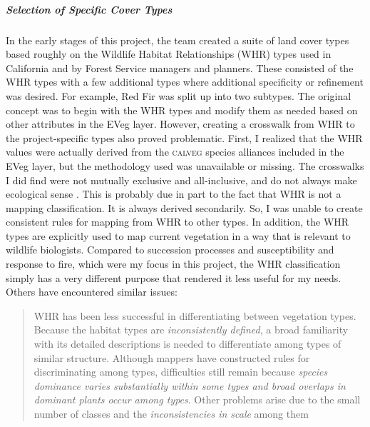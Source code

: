 

\subparagraph*{Selection of Specific Cover Types}
In the early stages of this project, the team created a suite of land cover types based roughly on the Wildlife Habitat Relationships (WHR) types used in California and by Forest Service managers and planners. These consisted of the WHR types with a few additional types where additional specificity or refinement was desired. For example, Red Fir was split up into two subtypes. The original concept was to begin with the WHR types and modify them as needed based on other attributes in the EVeg layer. However, creating a crosswalk from WHR to the project-specific types also proved problematic. First, I realized that the WHR values were actually derived from the \textsc{calveg} species alliances included in the EVeg layer, but the methodology used was unavailable or missing. The crosswalks I did find were not mutually exclusive and all-inclusive, and do not always make ecological sense \citep{Keeler-Wolf2007,DeBecker1988,Game2005}. This is probably due in part to the fact that WHR is not a mapping classification. It is always derived secondarily. So, I was unable to create consistent rules for mapping from WHR to other types. In addition, the WHR types are explicitly used to map current vegetation in a way that is relevant to wildlife biologists. Compared to succession processes and susceptibility and response to fire, which were my focus in this project, the WHR classification simply has a very different purpose that rendered it less useful for my needs. Others have encountered similar issues:
%
\begin{quote}
WHR has been less successful in differentiating between vegetation types. Because the habitat types are \emph{inconsistently defined}, a broad familiarity with its detailed descriptions is needed to differentiate among types of similar structure. Although mappers have constructed rules for discriminating among types, difficulties still remain because \emph{species dominance varies substantially within some types and broad overlaps in dominant plants occur among types}. Other problems arise due to the small number of classes and the \emph{inconsistencies in scale} among them \citep[23, emphasis added]{Keeler-Wolf2007}
\end{quote}
